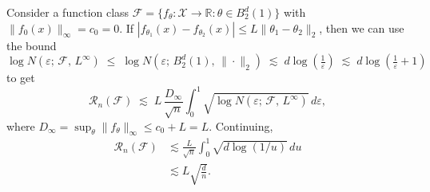 \begin{exam}
Consider a function class $\mathcal{F} = \{f_\theta : \mathcal{X} \to \mathbb{R} : \theta \in B_2^d(1)\}$ with $\|f_0(x)\|_\infty = c_0 = 0$. If $|f_{\theta_1}(x) - f_{\theta_2}(x)| \leq L\|\theta_1 - \theta_2\|_2$, then we can use the bound
\[
\log N(\varepsilon;\,\mathcal{F},\,L^\infty)
\;\leq\; \log N\!\left(\varepsilon;\,B_2^d(1),\,\|\cdot\|_2\right)
\;\lesssim\; d\log\!\left(\tfrac{1}{\varepsilon}\right)
\;\lesssim\; d\log\!\left(\tfrac{1}{\varepsilon} + 1\right)
\]
to get
\[
\mathcal{R}_n(\mathcal{F})
\;\lesssim\; L \,\frac{D_\infty}{\sqrt{n}} \int_{0}^{1} \sqrt{\log N(\varepsilon;\,\mathcal{F},\,L^\infty)}\, d\varepsilon,
\]
where $D_\infty = \sup_\theta \|f_\theta\|_\infty \leq c_0 + L = L$. Continuing,
\begin{align*}
\mathcal{R}_n(\mathcal{F})
&\lesssim \frac{L}{\sqrt{n}} \int_{0}^{1} \sqrt{d\log(1/u)}\, du \\
&\lesssim L\sqrt{\frac{d}{n}}.
\end{align*}
\end{exam}

